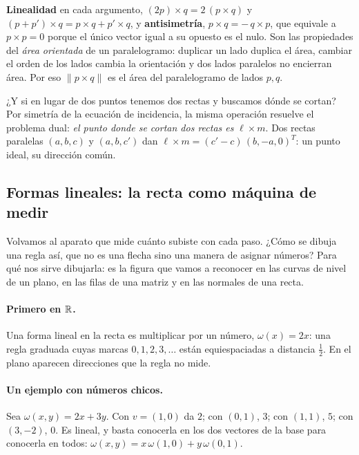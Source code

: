 \begin{resultado}
\textbf{Linealidad} en cada argumento, \((2p)\times q=2\,(p\times q)\) y
\((p+p')\times q=p\times q+p'\times q\), y \textbf{antisimetría}, \(p\times q=-\,q\times p\),
que equivale a \(p\times p=0\) porque el único vector igual a su opuesto es el nulo. Son las
propiedades del \emph{área orientada} de un paralelogramo: duplicar un lado duplica el área,
cambiar el orden de los lados cambia la orientación y dos lados paralelos no encierran área.
Por eso \(\lVert p\times q\rVert\) es el área del paralelogramo de lados \(p,q\).
\end{resultado}

¿Y si en lugar de dos puntos tenemos dos rectas y buscamos dónde se cortan? Por simetría de la
ecuación de incidencia, la misma operación resuelve el problema dual:
\emph{el punto donde se cortan dos rectas es} \(\ell\times m\). Dos rectas paralelas
\((a,b,c)\) y \((a,b,c')\) dan \(\ell\times m=(c'-c)\,(b,-a,0)^T\): un punto ideal, su
dirección común.

\subsection{Formas lineales: la recta como máquina de medir}\label{sec:formas-lineales}

{\small\vspace{1mm}\par}

Volvamos al aparato que mide cuánto subiste con cada paso. ¿Cómo se dibuja una regla así,
que no es una flecha sino una manera de asignar números? Para qué nos sirve dibujarla: es la
figura que vamos a reconocer en las curvas de nivel de un plano, en las filas de una matriz y
en las normales de una recta.

\paragraph{Primero en \(\mathbb{R}\).} Una forma lineal en la recta es multiplicar por un número,
\(\omega(x)=2x\): una regla graduada cuyas marcas \(0,1,2,3,\ldots\) están equiespaciadas a
distancia \(\tfrac12\). En el plano aparecen direcciones que la regla no mide.

\paragraph{Un ejemplo con números chicos.} Sea \(\omega(x,y)=2x+3y\). Con \(v=(1,0)\) da
\(2\); con \((0,1)\), \(3\); con \((1,1)\), \(5\); con \((3,-2)\), \(0\). Es lineal, y basta
conocerla en los dos vectores de la base para conocerla en todos:
\(\omega(x,y)=x\,\omega(1,0)+y\,\omega(0,1)\).

